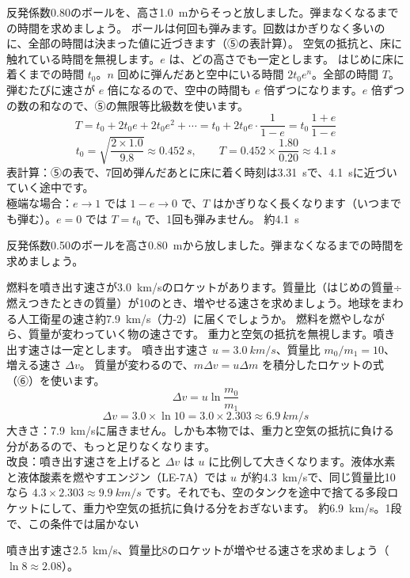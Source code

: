 \label{ph:力-3:ex12}
\begin{phreidai}[弾み続けるボールが止まるまでの時間]
反発係数0.80のボールを、高さ\qty{1.0}{m}からそっと放しました。弾まなくなるまでの時間を求めましょう。
\phbamen
ボールは何回も弾みます。回数はかぎりなく多いのに、全部の時間は決まった値に近づきます（⑤の表計算）。
\phmushi
空気の抵抗と、床に触れている時間を無視します。$e$ は、どの高さでも一定とします。
\phzu
はじめに床に着くまでの時間 $t_0$。$n$ 回めに弾んだあと空中にいる時間 $2t_0e^n$。全部の時間 $T$。
\phriyu
弾むたびに速さが $e$ 倍になるので、空中の時間も $e$ 倍ずつになります。$e$ 倍ずつの数の和なので、⑤の無限等比級数を使います。
\phtateru
\[T=t_0+2t_0e+2t_0e^2+\cdots=t_0+2t_0e\cdot\frac{1}{1-e}=t_0\,\frac{1+e}{1-e}\]
\phtoku
\[t_0=\sqrt{\frac{2\times1.0}{9.8}}\approx\qty{0.452}{s},\qquad T=0.452\times\frac{1.80}{0.20}\approx\qty{4.1}{s}\]
\phtashikame
表計算：⑤の表で、7回め弾んだあとに床に着く時刻は\qty{3.31}{s}で、\qty{4.1}{s}に近づいていく途中です。\\
極端な場合：$e\to1$ では $1-e\to0$ で、$T$ はかぎりなく長くなります（いつまでも弾む）。$e=0$ では $T=t_0$ で、1回も弾みません。
\kotae 約\qty{4.1}{s}
\end{phreidai}
\begin{jibun}
反発係数0.50のボールを高さ\qty{0.80}{m}から放しました。弾まなくなるまでの時間を求めましょう。
\end{jibun}

\label{ph:力-3:ex13}
\begin{phreidai}[1段のロケットで宇宙へ行ける？]
燃料を噴き出す速さが\qty{3.0}{km/s}のロケットがあります。質量比（はじめの質量÷燃えつきたときの質量）が10のとき、増やせる速さを求めましょう。地球をまわる人工衛星の速さ約\qty{7.9}{km/s}（力-2）に届くでしょうか。
\phbamen
燃料を燃やしながら、質量が変わっていく物の速さです。
\phmushi
重力と空気の抵抗を無視します。噴き出す速さは一定とします。
\phzu
噴き出す速さ $u=\qty{3.0}{km/s}$、質量比 $m_0/m_1=10$、増える速さ $\Delta v$。
\phriyu
質量が変わるので、$m\Delta v=u\Delta m$ を積分したロケットの式（⑥）を使います。
\phtateru
\[\Delta v=u\ln\frac{m_0}{m_1}\]
\phtoku
\[\Delta v=3.0\times\ln10=3.0\times2.303\approx\qty{6.9}{km/s}\]
\phtashikame
大きさ：\qty{7.9}{km/s}に届きません。しかも本物では、重力と空気の抵抗に負ける分があるので、もっと足りなくなります。\\
改良：噴き出す速さを上げると $\Delta v$ は $u$ に比例して大きくなります。液体水素と液体酸素を燃やすエンジン（LE-7A）では $u$ が約\qty{4.3}{km/s}で、同じ質量比10なら $4.3\times2.303\approx\qty{9.9}{km/s}$ です。それでも、空のタンクを途中で捨てる多段ロケットにして、重力や空気の抵抗に負ける分をおぎないます。
\kotae 約\qty{6.9}{km/s}。1段で、この条件では届かない
\end{phreidai}
\begin{jibun}
噴き出す速さ\qty{2.5}{km/s}、質量比8のロケットが増やせる速さを求めましょう（$\ln8\approx2.08$）。
\end{jibun}

